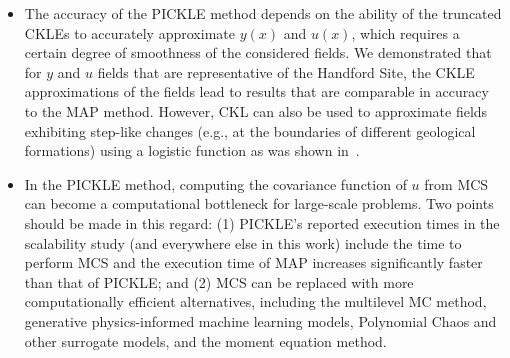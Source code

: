 \documentclass{agujournal2019}
\begin{document}
\begin{itemize}
\item The accuracy of the PICKLE method depends on the ability of the truncated CKLEs to accurately approximate $y(x)$ and $u(x)$, which requires a certain degree of smoothness of the considered fields. We demonstrated that for $y$ and $u$ fields that are representative of the Handford Site, the CKLE approximations of the fields lead to results that are comparable in accuracy to the MAP method. However,  CKL can also be used to approximate fields exhibiting step-like changes (e.g., at the boundaries of different geological formations) using a logistic function as was shown in~\citep{barajassolano-2019-pickle}.
\item In the PICKLE method, computing the covariance function of $u$ from MCS can become a computational bottleneck for large-scale problems. Two points should be made in this regard: (1) PICKLE's reported execution times in the scalability study (and everywhere else in this work) include the time to perform MCS and the execution time of MAP increases significantly faster than that of PICKLE; and (2) MCS can be replaced with more computationally efficient alternatives, including  the multilevel MC method, generative physics-informed machine learning models, Polynomial Chaos and other surrogate models, and the moment equation method.
\end{itemize}
\end{document}
